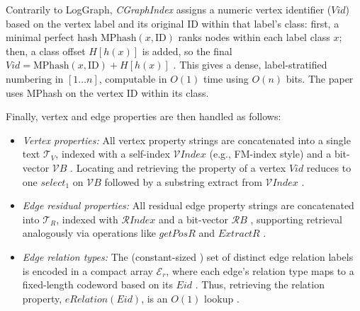 Contrarily to LogGraph, \emph{CGraphIndex} assigns a numeric vertex identifier (\(\mathit{Vid}\)) based on the vertex label and its original ID within that label's class: first, a minimal perfect hash $\mathrm{MPhash}(x,\mathrm{ID})$ ranks nodes within each label class $x$; then, a class offset $H[h(x)]$ is added, so the final $\mathit{Vid} = \mathrm{MPhash}(x,\mathrm{ID}) + H[h(x)]$ . This gives a dense, label-stratified numbering in $[1 \ldots n]$, computable in $O(1)$ time using $O(n)$ bits. The paper uses MPhash on the vertex ID within its class.

Finally, vertex and edge properties are then handled as follows:
\begin{itemize}
    \item \emph{Vertex properties:} All vertex property strings are concatenated into a single text $\mathcal{T}_V$, indexed with a self-index $\mathcal{V}\mathit{Index}$ (e.g., FM-index style) and a bit-vector $\mathcal{V}\mathit{B}$ . Locating and retrieving the property of a vertex $\mathit{Vid}$ reduces to one $\mathit{select}_1$ on $\mathcal{V}\mathit{B}$ followed by a substring extract from $\mathcal{V}\mathit{Index}$ .
    
    \item \emph{Edge residual properties:} All residual edge property strings are concatenated into $\mathcal{T}_R$, indexed with $\mathcal{R}\mathit{Index}$ and a bit-vector $\mathcal{R}\mathit{B}$ , supporting retrieval analogously via operations like $\mathit{getPosR}$ and $\mathit{ExtractR}$ .
    
    \item \emph{Edge relation types:} The (constant-sized ) set of distinct edge relation labels is encoded in a compact array $\mathcal{E}_r$, where each edge's relation type maps to a fixed-length codeword based on its $\mathit{Eid}$ . Thus, retrieving the relation property, $\mathit{eRelation}(\mathit{Eid})$, is an $O(1)$ lookup .
\end{itemize}
